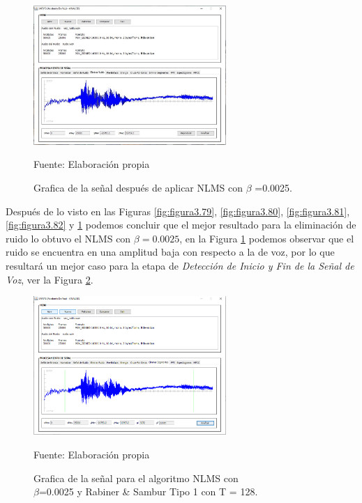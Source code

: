 \begin{figure}[H]
\begin{center}
\includegraphics[width=0.65\textwidth]{Imagenes/Cap3/image083}
\end{center}
\begin{center}
\vskip -0.5cm
\caption{\small{Grafica de la señal después de aplicar NLMS con $\beta$ =0.0025.}}
\label{fig:figura3.83}
{\small{Fuente: Elaboración propia}}
\end{center}
\end{figure}

Después de lo visto en las Figuras \ref{fig:figura3.79}, \ref{fig:figura3.80}, \ref{fig:figura3.81}, \ref{fig:figura3.82} y \ref{fig:figura3.83} podemos concluir que el mejor resultado para la eliminación de ruido lo obtuvo el NLMS con $\beta = 0.0025$, en la Figura \ref{fig:figura3.83} podemos observar que el ruido se encuentra en una amplitud baja con respecto a la de voz, por lo que resultará un mejor caso para la etapa de \textit{Detección de Inicio y Fin de la Señal de Voz}, ver la Figura \ref{fig:figura3.84}.

\begin{figure}[H]
\captionsetup{justification=centering}
\begin{center}
\includegraphics[width=0.65\textwidth]{Imagenes/Cap3/image084}
\end{center}
\begin{center}
\vskip -0.5cm
\caption{\small{Grafica de la señal para el algoritmo NLMS con \\ $\beta$=0.0025 y Rabiner \& Sambur Tipo 1 con T = 128.}}
\label{fig:figura3.84}
{\small{Fuente: Elaboración propia}}
\end{center}
\end{figure}

